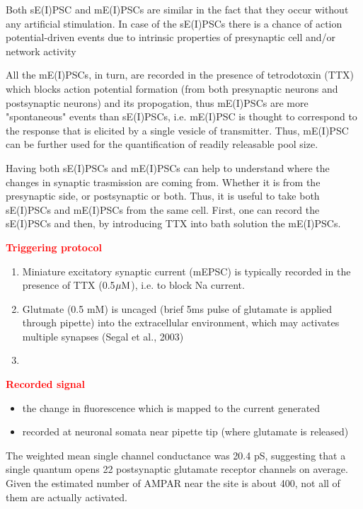 Both sE(I)PSC and mE(I)PSCs are similar in the fact that they occur without any
artificial stimulation.
In case of the sE(I)PSCs there is a chance of action potential-driven events due
to intrinsic properties of presynaptic cell and/or network activity

All the mE(I)PSCs, in turn, are recorded in the presence of tetrodotoxin (TTX)
which blocks action potential formation (from both presynaptic neurons and
postsynaptic neurons) and its propogation, thus mE(I)PSCs are more "spontaneous"
events than sE(I)PSCs, i.e. mE(I)PSC is thought to correspond to the response
that is elicited by a single vesicle of transmitter.
Thus, mE(I)PSC can be further used for the quantification of readily releasable
pool size.

Having both sE(I)PSCs and mE(I)PSCs can help to understand where the changes in
synaptic trasmission are coming from. Whether it is from the presynaptic side,
or postsynaptic or both. Thus, it is useful to take both  sE(I)PSCs and
mE(I)PSCs  from the same cell.
First, one can record the sE(I)PSCs and then, by introducing TTX into bath
solution the mE(I)PSCs.

\textcolor{red}{\bf Triggering protocol}
\begin{enumerate}
  \item  Miniature excitatory synaptic current (mEPSC) is typically recorded in the
presence of TTX (0.5${\mu\text{M}}$), i.e. to block Na current.
  
  \item Glutmate (0.5 mM) is uncaged (brief 5ms pulse of glutamate is applied
  through pipette) into the extracellular environment, which may activates
  multiple synapses (Segal et al., 2003)
  
  \item 
\end{enumerate}

\textcolor{red}{\bf Recorded signal}
\begin{itemize}
  \item the change in fluorescence which is mapped to the current generated
  
  \item recorded at neuronal somata near pipette tip (where glutamate is
  released)
\end{itemize}


The weighted mean single channel conductance was 20.4 pS, suggesting that a
single quantum opens 22 postsynaptic glutamate receptor channels on average.
Given the estimated number of AMPAR near the site is about 400, not all of them
are actually activated.



